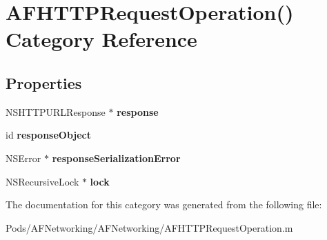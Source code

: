 \hypertarget{category_a_f_h_t_t_p_request_operation_07_08}{}\section{A\+F\+H\+T\+T\+P\+Request\+Operation() Category Reference}
\label{category_a_f_h_t_t_p_request_operation_07_08}
\subsection*{Properties}
\begin{DoxyCompactItemize}
\item 
\mbox{\label{category_a_f_h_t_t_p_request_operation_07_08_a5ad5b807b287afadadefdbec24456ee5}} 
N\+S\+H\+T\+T\+P\+U\+R\+L\+Response $\ast$ {\bfseries response}
\item 
\mbox{\label{category_a_f_h_t_t_p_request_operation_07_08_aa1bec7d5e8060c8f2e452bddf718f06e}} 
id {\bfseries response\+Object}
\item 
\mbox{\label{category_a_f_h_t_t_p_request_operation_07_08_afae5af9727035f7beb8d46110b0e8a33}} 
N\+S\+Error $\ast$ {\bfseries response\+Serialization\+Error}
\item 
\mbox{\label{category_a_f_h_t_t_p_request_operation_07_08_af15e0185abdd50087387f36f1f076a51}} 
N\+S\+Recursive\+Lock $\ast$ {\bfseries lock}
\end{DoxyCompactItemize}


The documentation for this category was generated from the following file\+:\begin{DoxyCompactItemize}
\item 
Pods/\+A\+F\+Networking/\+A\+F\+Networking/A\+F\+H\+T\+T\+P\+Request\+Operation.\+m\end{DoxyCompactItemize}
